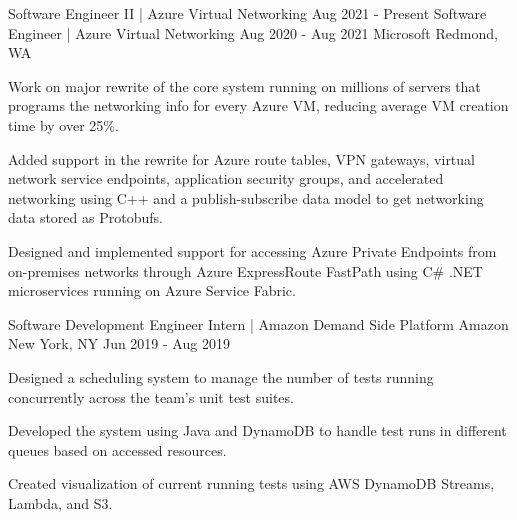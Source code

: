

\begin{cventries}

  \cventrytwopositions
  {Software Engineer II | Azure Virtual Networking}
  {Aug 2021 - Present}
  {Software Engineer | Azure Virtual Networking}
  {Aug 2020 - Aug 2021}
  {Microsoft}
  {Redmond, WA}
  {
    \begin{cvitems} %
      \item {Work on major rewrite of the core system running on millions of servers that programs the networking info for every Azure VM, reducing average VM creation time by over 25\%.}
      \item {Added support in the rewrite for Azure route tables, VPN gateways, virtual network service endpoints, application security groups, and accelerated networking using C++ and a publish-subscribe data model to get networking data stored as Protobufs.}
      \item {Designed and implemented support for accessing Azure Private Endpoints from on-premises networks through Azure ExpressRoute FastPath using C\# .NET microservices running on Azure Service Fabric.}
    \end{cvitems}
  }

  \cventry
  {Software Development Engineer Intern | Amazon Demand Side Platform} %
  {Amazon} %
  {New York, NY} %
  {Jun 2019 - Aug 2019} %
  {
    \begin{cvitems} %
      \item {Designed a scheduling system to manage the number of tests running concurrently across the team's unit test suites.}
      \item {Developed the system using Java and DynamoDB to handle test runs in different queues based on accessed resources.}
      \item {Created visualization of current running tests using AWS DynamoDB Streams, Lambda, and S3.}
    \end{cvitems}
  }


\end{cventries}

